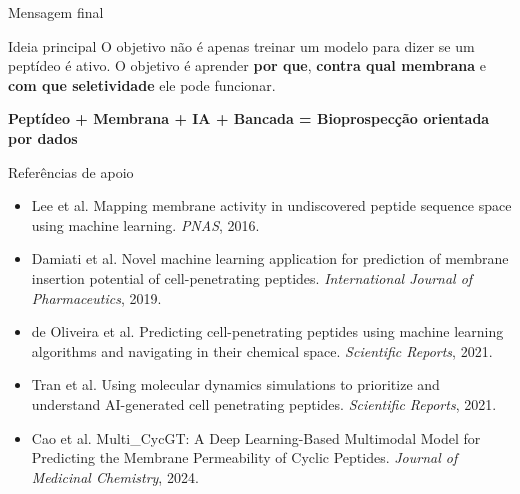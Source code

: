 \documentclass[aspectratio=169,10pt]{beamer}
\begin{document}
\begin{frame}{Mensagem final}
\begin{block}{Ideia principal}
O objetivo não é apenas treinar um modelo para dizer se um peptídeo é ativo. O objetivo é aprender \textbf{por que}, \textbf{contra qual membrana} e \textbf{com que seletividade} ele pode funcionar.
\end{block}

\vspace{0.3cm}
\begin{center}
\Large\bfseries\color{InovGreen}
Peptídeo + Membrana + IA + Bancada = Bioprospecção orientada por dados
\end{center}
\end{frame}

\begin{frame}{Referências de apoio}
\small
\begin{itemize}
  \item Lee et al. Mapping membrane activity in undiscovered peptide sequence space using machine learning. \textit{PNAS}, 2016.
  \item Damiati et al. Novel machine learning application for prediction of membrane insertion potential of cell-penetrating peptides. \textit{International Journal of Pharmaceutics}, 2019.
  \item de Oliveira et al. Predicting cell-penetrating peptides using machine learning algorithms and navigating in their chemical space. \textit{Scientific Reports}, 2021.
  \item Tran et al. Using molecular dynamics simulations to prioritize and understand AI-generated cell penetrating peptides. \textit{Scientific Reports}, 2021.
  \item Cao et al. Multi\_CycGT: A Deep Learning-Based Multimodal Model for Predicting the Membrane Permeability of Cyclic Peptides. \textit{Journal of Medicinal Chemistry}, 2024.
\end{itemize}
\end{frame}
\end{document}
